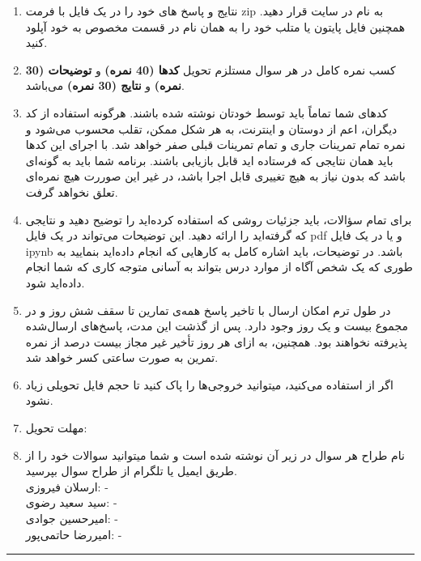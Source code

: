 \documentclass[a4paper]{article}
\begin{document}
\begin{enumerate}
	\item 
نتایج و پاسخ های خود را در یک فایل با فرمت zip به نام
 در سایت  
\href{https://quera.org/course/add_to_course/course/10598/}{} 
 قرار دهید. همچنین فایل پایتون یا متلب خود را به همان نام در قسمت مخصوص به خود آپلود کنید.
\item 
کسب نمره کامل در هر سوال مستلزم تحویل  
\textbf{کدها (40 نمره)}
 و
\textbf{توضیحات (30 نمره)}
و
\textbf{نتایج (30 نمره)}
 می‌باشد. 
\item 
کدهای شما تماماً باید توسط خودتان نوشته شده باشند. هرگونه استفاده از کد دیگران، اعم از دوستان و اینترنت، به هر شکل ممکن، تقلب محسوب می‌شود و نمره تمام تمرینات جاری و تمام تمرینات قبلی صفر خواهد شد. با اجرای این کدها باید همان نتایجی که فرستاده اید قابل بازیابی باشند. برنامه شما باید به گونه‌ای باشد که بدون نیاز به هیچ تغییری قابل اجرا باشد، در غیر این‌ صوررت هیچ نمره‌ای تعلق نخواهد گرفت. 
\item 
برای تمام سؤالات، باید جزئیات روشی که استفاده کرده‌اید را توضیح دهید و نتایجی که گرفته‌اید را ارائه دهید. این توضیحات می‌تواند در یک فایل  pdf  و یا در یک فایل  ipynb باشد. در توضیحات، باید اشاره کامل به کارهایی که انجام داده‌اید بنمایید به طوری که یک شخص آگاه از موارد درس بتواند به آسانی متوجه کاری که شما انجام داده‌اید شود.
\item 
در طول ترم امکان ارسال با تاخیر پاسخ  همه‌ی تمارین تا سقف شش روز و در مجموع بیست و یک روز وجود دارد. پس از گذشت این مدت، پاسخ‌های ارسال‌شده پذیرفته نخواهند بود. همچنین، به ازای هر روز تأخیر غیر مجاز  بیست درصد از نمره تمرین به صورت ساعتی کسر خواهد شد.
\item 
 اگر از
 استفاده می‌کنید، میتوانید خروجی‌ها‌ را پاک کنید تا حجم فایل تحویلی زیاد نشود.
\item 
مهلت تحویل: 
\item 
نام طراح هر سوال در زیر آن نوشته شده است و شما میتوانید سوالات خود را از طریق ایمیل یا تلگرام از طراح سوال بپرسید.
\\
ارسلان فیروزی:
 - 
\\
سید سعید رضوی:
 - 
\\
امیرحسین جوادی:
 - 
\\
امیررضا حاتمی‌پور:
 - 
\end{enumerate}
\rule[0.1\baselineskip]{\textwidth}{1pt}
\end{document}
